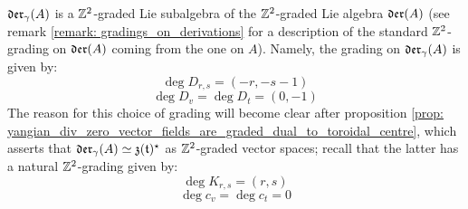         \begin{corollary} \label{coro: yangian_div_zero_vector_fields_are_graded}
            $\mathfrak{der}_{\gamma}(A)$ is a $\mathbb{Z}^2$-graded Lie subalgebra of the $\mathbb{Z}^2$-graded Lie algebra $\mathfrak{der}(A)$ (see remark \ref{remark: gradings_on_derivations} for a description of the standard $\mathbb{Z}^2$-grading on $\mathfrak{der}(A)$ coming from the one on $A$). Namely, the grading on $\mathfrak{der}_{\gamma}(A)$ is given by:
                $$\deg D_{r, s} = (-r, -s - 1)$$
                $$\deg D_v = \deg D_t = (0, -1)$$
            The reason for this choice of grading will become clear after proposition \ref{prop: yangian_div_zero_vector_fields_are_graded_dual_to_toroidal_centre}, which asserts that $\mathfrak{der}_{\gamma}(A) \simeq \mathfrak{z}(\mathfrak{t})^{\star}$ as $\mathbb{Z}^2$-graded vector spaces; recall that the latter has a natural $\mathbb{Z}^2$-grading given by:
                $$\deg K_{r, s} = (r, s)$$
                $$\deg c_v = \deg c_t = 0$$
        \end{corollary}

